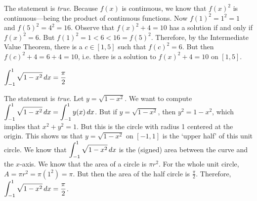 \documentclass[11pt,letterpaper]{article}
\begin{document}
\sol The statement is \textit{true}. Because $f(x)$ is continuous, we know that $f(x)^2$ is continuous---being the product of continuous functions. Now $f(1)^2= 1^2= 1$ and $f(5)^2= 4^2= 16$. Observe that $f(x)^2 + 4= 10$ has a solution if and only if $f(x)^2= 6$. But $f(1)^2= 1 < 6 < 16= f(5)^2$. Therefore, by the Intermediate Value Theorem, there is a $c \in [1, 5]$ such that $f(c)^2= 6$. But then $f(c)^2 + 4= 6 + 4= 10$, i.e. there is a solution to $f(x)^2 + 4= 10$ on $[1, 5]$. 



\newpage



 $\displaystyle\int_{-1}^1 \sqrt{1 - x^2} \,dx= \frac{\pi}{2}$  \pspace

\sol The statement is \textit{true}. Let $y= \sqrt{1 - x^2}$. We want to compute $\displaystyle\int_{-1}^1 \sqrt{1 - x^2} \,dx= \int_{-1}^1 y(x) \,dx$. But if $y= \sqrt{1 - x^2}$, then $y^2= 1 - x^2$, which implies that $x^2 + y^2= 1$. But this is the circle with radius 1 centered at the origin. This shows us that $y= \sqrt{1 - x^2}$ on $[-1, 1]$ is the `upper half' of this unit circle. We know that $\displaystyle\int_{-1}^1 \sqrt{1 - x^2} \,dx$ is the (signed) area between the curve and the $x$-axis. We know that the area of a circle is $\pi r^2$. For the whole unit circle, $A= \pi r^2= \pi (1^2)= \pi$. But then the area of the half circle is $\frac{\pi}{2}$. Therefore, $\displaystyle\int_{-1}^1 \sqrt{1 - x^2} \,dx= \frac{\pi}{2}$. \pvspace{1.3cm}
\end{document}
